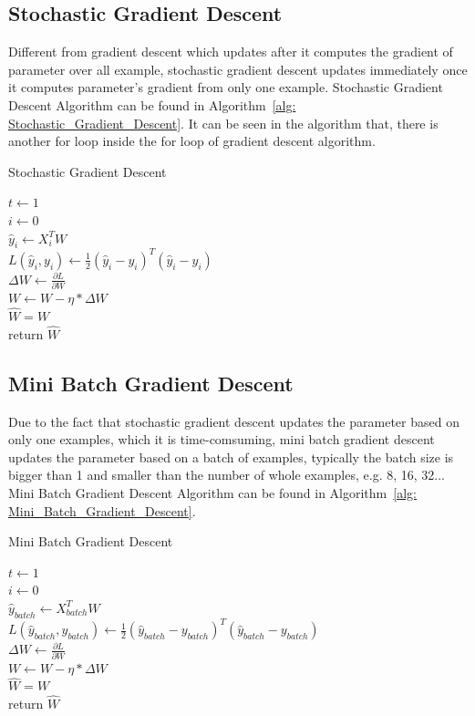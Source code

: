 \documentclass[journal, a4paper]{IEEEtran}
\begin{document}
\subsection{Stochastic Gradient Descent}
Different from gradient descent which updates after it computes the gradient of parameter over all example, stochastic gradient descent updates immediately once it computes parameter's gradient from only one example. Stochastic Gradient Descent Algorithm can be found in Algorithm~\ref{alg: Stochastic_Gradient_Descent}. It can be seen in the algorithm that, there is another for loop inside the for loop of gradient descent algorithm.
\begin{algorithm}
		\label{alg: Stochastic_Gradient_Descent}
	\caption{Stochastic Gradient Descent}
	$t \gets 1$ \\
	{
		$ i \gets 0 $ \\
		{
			$\hat{y}_{i} \gets X^{T}_{i}W $ \\
			$ L(\hat{y}_{i}, y_{i}) \gets \frac{1}{2}(\hat{y}_{i} - y_{i})^{T}(\hat{y}_{i} - y_{i})$ \\
			$\Delta{W} \gets \frac{\partial L}{\partial W}$ \\
			$W \gets W - \eta * \Delta{W}$ \\
		}
	}
	$\hat{W} = W$ \\
	return $\hat{W}$
\end{algorithm}

\subsection{Mini Batch Gradient Descent}
Due to the fact that stochastic gradient descent updates the parameter based on only one examples, which it is time-comsuming, mini batch gradient descent updates the parameter based on a batch of examples, typically the batch size is bigger than 1 and smaller than the number of whole examples, e.g. 8, 16, 32... Mini Batch Gradient Descent Algorithm can be found in Algorithm~\ref{alg: Mini_Batch_Gradient_Descent}.
\begin{algorithm}
	\label{alg: Mini_Batch_Gradient_Descent}
	\caption{Mini Batch Gradient Descent}
	$t \gets 1$ \\
	{
		$ i \gets 0 $ \\
		{
			$\hat{y}_{batch} \gets X^{T}_{batch}W $ \\
			$ L(\hat{y}_{batch}, y_{batch}) \gets \frac{1}{2}(\hat{y}_{batch} - y_{batch})^{T}(\hat{y}_{batch} - y_{batch})$ \\
			$\Delta{W} \gets \frac{\partial L}{\partial W}$ \\
			$W \gets W - \eta * \Delta{W}$ \\
		}
	}
	$\hat{W} = W$ \\
	return $\hat{W}$
\end{algorithm}
\end{document}

